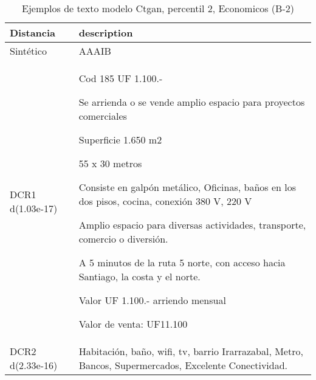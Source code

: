 \begin{table}[H]
\centering
\fontsize{10}{14}\selectfont
\caption{Ejemplos de texto modelo Ctgan, percentil 2, Economicos (B-2)}
\label{table-example-economicos-b-2-ctgan-2p-text}
\begin{tabular}{|l|m{35em}|}
\hline
\rowcolor[gray]{0.8}
Distancia & description \\
\hline Sintético & AAAIB \\
\hline DCR1 d(1.03e-17) & Cod 185 UF 1.100.-

Se arrienda o se vende amplio espacio para proyectos comerciales

Superficie 1.650 m2

55 x 30 metros

Consiste en galp\'on met\'alico, Oficinas, ba\~nos en los dos pisos, cocina, conexi\'on 380 V, 220 V

Amplio espacio para diversas actividades, transporte, comercio o diversi\'on.

A 5 minutos de la ruta 5 norte, con acceso hacia Santiago, la costa y el norte.

Valor UF 1.100.- arriendo mensual

Valor de venta: UF11.100 \\
\hline DCR2 d(2.33e-16) & Habitaci\'on, ba\~no, wifi, tv, barrio Irarrazabal, Metro, Bancos, Supermercados, Excelente Conectividad. \\
\hline
\end{tabular}
\end{table}
